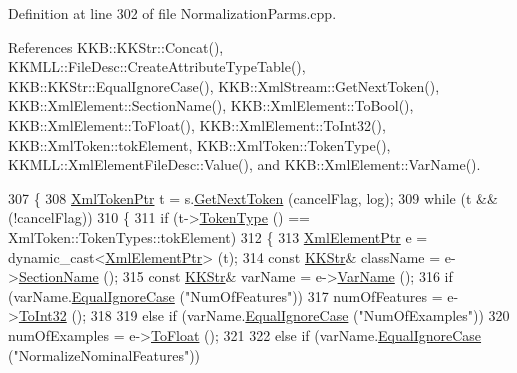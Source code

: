 Definition at line 302 of file Normalization\+Parms.\+cpp.



References K\+K\+B\+::\+K\+K\+Str\+::\+Concat(), K\+K\+M\+L\+L\+::\+File\+Desc\+::\+Create\+Attribute\+Type\+Table(), K\+K\+B\+::\+K\+K\+Str\+::\+Equal\+Ignore\+Case(), K\+K\+B\+::\+Xml\+Stream\+::\+Get\+Next\+Token(), K\+K\+B\+::\+Xml\+Element\+::\+Section\+Name(), K\+K\+B\+::\+Xml\+Element\+::\+To\+Bool(), K\+K\+B\+::\+Xml\+Element\+::\+To\+Float(), K\+K\+B\+::\+Xml\+Element\+::\+To\+Int32(), K\+K\+B\+::\+Xml\+Token\+::tok\+Element, K\+K\+B\+::\+Xml\+Token\+::\+Token\+Type(), K\+K\+M\+L\+L\+::\+Xml\+Element\+File\+Desc\+::\+Value(), and K\+K\+B\+::\+Xml\+Element\+::\+Var\+Name().


\begin{DoxyCode}
307 \{
308   \hyperlink{class_k_k_b_1_1_xml_token}{XmlTokenPtr}  t = s.\hyperlink{class_k_k_b_1_1_xml_stream_a87cc738b05c666cf5d5c25beaab477b4}{GetNextToken} (cancelFlag, log);
309   \textcolor{keywordflow}{while}  (t  &&  (!cancelFlag))
310   \{
311     \textcolor{keywordflow}{if}  (t->\hyperlink{class_k_k_b_1_1_xml_token_ae98e2c1a798882647578cae4adcd7176}{TokenType} () == XmlToken::TokenTypes::tokElement)
312     \{
313       \hyperlink{class_k_k_b_1_1_xml_element}{XmlElementPtr}  e = \textcolor{keyword}{dynamic\_cast<}\hyperlink{class_k_k_b_1_1_xml_element}{XmlElementPtr}\textcolor{keyword}{>} (t);
314       \textcolor{keyword}{const} \hyperlink{class_k_k_b_1_1_k_k_str}{KKStr}&  className = e->\hyperlink{class_k_k_b_1_1_xml_element_a2b85dcb37a0f63bd7979d16d12296876}{SectionName} ();
315       \textcolor{keyword}{const} \hyperlink{class_k_k_b_1_1_k_k_str}{KKStr}&  varName = e->\hyperlink{class_k_k_b_1_1_xml_element_aef57cf00be66a3a387ce849b35125f51}{VarName} ();
316       \textcolor{keywordflow}{if}  (varName.\hyperlink{class_k_k_b_1_1_k_k_str_a562f9696417c53f66bc4088eac072ab5}{EqualIgnoreCase} (\textcolor{stringliteral}{"NumOfFeatures"}))
317         numOfFeatures = e->\hyperlink{class_k_k_b_1_1_xml_element_aac7463c7b305f66b5157f424a0a76363}{ToInt32} ();
318 
319       \textcolor{keywordflow}{else} \textcolor{keywordflow}{if}  (varName.\hyperlink{class_k_k_b_1_1_k_k_str_a562f9696417c53f66bc4088eac072ab5}{EqualIgnoreCase} (\textcolor{stringliteral}{"NumOfExamples"}))
320         numOfExamples = e->\hyperlink{class_k_k_b_1_1_xml_element_aa728687ed43e76d45d029dfc14e14e95}{ToFloat} ();
321 
322       \textcolor{keywordflow}{else} \textcolor{keywordflow}{if}  (varName.\hyperlink{class_k_k_b_1_1_k_k_str_a562f9696417c53f66bc4088eac072ab5}{EqualIgnoreCase} (\textcolor{stringliteral}{"NormalizeNominalFeatures"}))

\end{DoxyCode}
